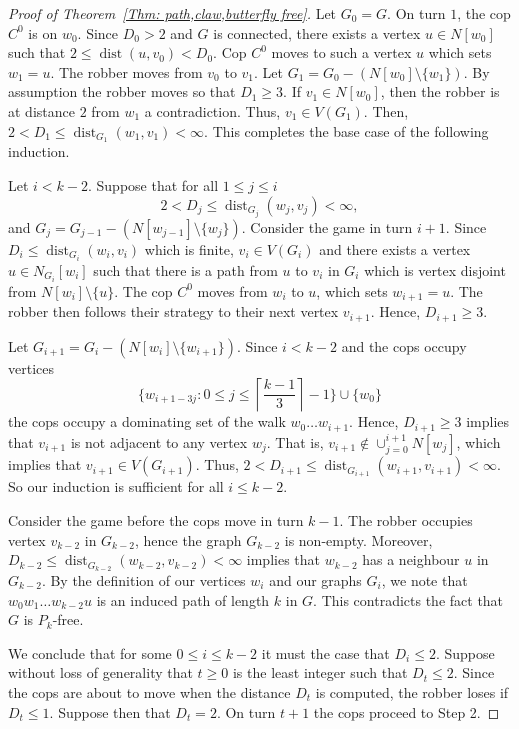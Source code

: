 \documentclass[12pt]{article}
\theoremstyle{definition}
\DeclareMathOperator{\dist}{dist}
\begin{document}
\begin{proof}[Proof of Theorem~\ref{Thm: path,claw,butterfly free}]
Let $G_0 = G$.
On turn $1$, the cop $C^0$ is on $w_0$.
Since $D_0 > 2$ and $G$ is connected, there exists a vertex $u \in N[w_0]$ such that $2 \leq \dist(u,v_0) < D_0$.
Cop $C^0$ moves to such a vertex $u$ which sets $w_1 = u$.
The robber moves from $v_0$ to $v_1$.
Let $G_1 = G_0 - (N[w_0]\setminus \{w_1\})$.
By assumption the robber moves so that $D_1 \geq 3$.
If $v_1 \in N[w_0]$, then the robber is at distance $2$ from $w_1$ a contradiction.
Thus, $v_1 \in V(G_1)$.
Then, $2 < D_1 \leq \dist_{G_1}(w_1,v_1) < \infty $. This completes the base case of the following induction.



Let $i < k-2$.
Suppose that for all $1 \leq j \leq i$
\[2 < D_j \leq \dist_{G_j}(w_j,v_j) < \infty,\]
and $G_j = G_{j-1} - (N[w_{j-1}]\setminus \{w_j\})$.
Consider the game in turn $i+1$.
Since $D_i \leq \dist_{G_i}(w_i,v_i)$ which is finite, 
$v_i \in V(G_i)$ and there exists a vertex $u \in N_{G_i}[w_i]$ 
such that there is a path from $u$ to $v_i$ in $G_i$ which is vertex disjoint from $N[w_i]\setminus \{u\}$.
The cop $C^0$ moves from $w_i$ to $u$, which sets $w_{i+1} = u$.
The robber then follows their strategy to their next vertex $v_{i+1}$. Hence, $D_{i+1} \geq 3$.


Let $G_{i+1} = G_i - (N[w_i]\setminus \{w_{i+1}\})$.
Since $i < k-2$ and the cops occupy vertices 
\[
\Big \{w_{i+1-3j}: 0 \leq j \leq \left\lceil\frac{k-1}{3} \right\rceil-1 \Big\} \cup \{w_0\}
\]
the cops occupy a dominating set of the walk $w_0\dots w_{i+1}$.
Hence, $D_{i+1}\geq 3$ implies that $v_{i+1}$ is not adjacent to any vertex $w_j$.
That is,
$v_{i+1} \notin \cup_{j=0}^{i+1} N[w_j]$,
which implies that $v_{i+1} \in V(G_{i+1})$.
Thus, $2 < D_{i+1} \leq \dist_{G_{i+1}}(w_{i+1},v_{i+1}) < \infty$. So our induction is sufficient for all
$i \leq k-2$.


Consider the game before the cops move in turn $k-1$.
The robber occupies vertex $v_{k-2}$ in $G_{k-2}$, hence the graph $G_{k-2}$ is non-empty.
Moreover,
$D_{k-2} \leq \dist_{G_{k-2}}(w_{k-2},v_{k-2}) < \infty$
implies that $w_{k-2}$ has a neighbour $u$ in $G_{k-2}$.
By the definition of our vertices $w_i$ and our graphs $G_i$, we note that $w_0w_1\dots w_{k-2}u$ is an induced path of length $k$ in $G$.
This contradicts the fact that $G$ is $P_k$-free.



We conclude that for some $0 \leq i \leq k-2$ it must the case that $D_{i}\leq 2$.
Suppose without loss of generality that $t\geq 0$ is the least integer such that $D_t \leq 2$.
Since the cops are about to move when the distance $D_t$ is computed, the robber loses if $D_t \leq 1$.
Suppose then that $D_t = 2$.
On turn $t+1$ the cops proceed to Step 2.




\end{proof}
\end{document}
